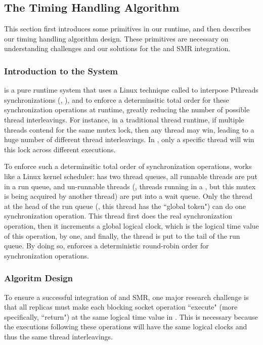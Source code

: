 

\subsection{The Timing Handling Algorithm} \label{sec:rep-time-algo}
This section first introduces some primitives in our \parrot \smt runtime, and
then describes our timing handling algorithm design. These \parrot primitives
are necessary on understanding challenges and our solutions for the \smt and SMR
integration.

\subsubsection{Introduction to the \parrot \smt System} \label{sec:rep-parrot}
\parrot is a pure runtime system that uses a Linux technique called \ldpreload
to interpose Pthreads synchronizations (\eg, \mutexlock), and to enforce a
determinsitic total order for these synchronization operations at runtime,
greatly reducing the number of possible thread interleavings. For instance, in a
traditional thread runtime, if multiple threads contend for the same mutex lock,
then any thread may win, leading to a huge number of different thread
interleavings. In \parrot, only a specific thread will win this lock across
different executions.

To enforce such a determinsitic total order of synchronization operations,
\parrot works like a Linux kernel scheduler: \parrot has two thread queues, all
runnable threads are put in a run queue, and un-runnable threads (\eg, threads
running in a \mutexlock, but this mutex is being acquired by another thread) are
put into a wait queue. Only the thread at the head of the run queue (\ie, this
thread has the ``global token") can do one synchronization operation. This
thread first does the real synchronization operation, then it increments a
global logical clock, which is the logical time value of this operation, by one,
and finally, the thread is put to the tail of the run queue. By doing so,
\parrot enforces a deterministic round-robin order for synchronization
operations.


\subsubsection{Algoritm Design} \label{sec:rep-algo-rules}
To ensure a successful integration of \smt and SMR, one major research challenge
is that all replicas must make each blocking socket operation ``execute" (more
specifically, ``return") at the same logical time value in \smt. This is
necessary because the executions following these operations will have the same
logical clocks and thus the same thread interleavings.

